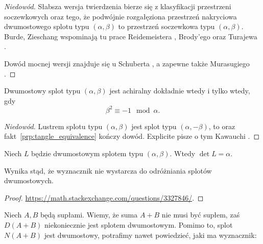 \begin{proof}[Niedowód]
    Słabsza wersja twierdzenia bierze się z klasyfikacji przestrzeni soczewkowych oraz tego, że podwójnie rozgałęziona przestrzeń nakryciowa dwumostowego splotu typu $(\alpha, \beta)$ to przestrzeń soczewkowa typu $(\alpha, \beta)$.
%
%
    Burde, Zieschang \cite[s. 212]{burde2014} wspominają tu prace Reidemeistera \cite{reidemeister1935}, Brody'ego \cite{brody1960} oraz Turajewa \cite{turaev2001}.

    Dowód mocnej wersji znajduje się u Schuberta \cite{schubert1956}, a zapewne także Murasugiego \cite[s. 158]{murasugi1996}.
\end{proof}

\begin{proposition}
    Dwumostowy splot typu $(\alpha, \beta)$ jest achiralny dokładnie wtedy i tylko wtedy, gdy
    \begin{equation}
        \beta^2 \equiv -1 \mod \alpha.
    \end{equation}
\end{proposition}

\begin{proof}[Niedowód]
    Lustrem splotu typu $(\alpha, \beta)$ jest splot typu $(\alpha, -\beta)$, to oraz fakt~\ref{prp:tangle_equivalence} kończy dowód.
    Explicite pisze o tym Kawauchi \cite[s. 24]{kawauchi1996}.
\end{proof}

\begin{proposition}
    Niech $L$ będzie dwumostowym splotem typu $(\alpha, \beta)$.
    Wtedy $\det L = \alpha$.
\end{proposition}

Wynika stąd, że wyznacznik nie wystarcza do odróżniania splotów dwumostowych.

\begin{proof}
    \url{https://math.stackexchange.com/questions/3327846/}.
\end{proof}

Niech $A, B$ będą supłami.
Wiemy, że suma $A+B$ nie musi być supłem, zaś $D(A+B)$ niekoniecznie jest splotem dwumostowym.
Pomimo to, splot $N(A+B)$ jest dwumostowy, potrafimy nawet powiedzieć, jaki ma wyznacznik:

